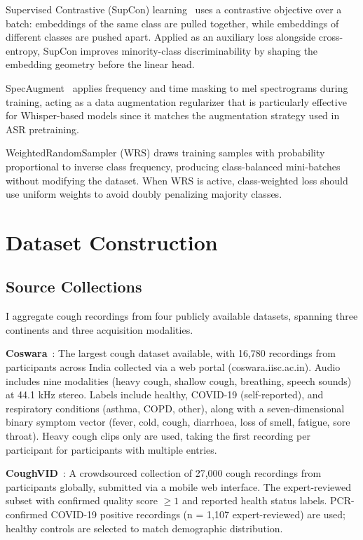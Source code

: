\documentclass[10pt,journal,compsoc]{IEEEtran}
\begin{document}
Supervised Contrastive (SupCon) learning~\cite{supcon} uses a contrastive
objective over a batch: embeddings of the same class are pulled together,
while embeddings of different classes are pushed apart. Applied as an
auxiliary loss alongside cross-entropy, SupCon improves minority-class
discriminability by shaping the embedding geometry before the linear head.

SpecAugment~\cite{specaugment} applies frequency and time masking to
mel spectrograms during training, acting as a data augmentation regularizer
that is particularly effective for Whisper-based models since it matches
the augmentation strategy used in ASR pretraining.

WeightedRandomSampler (WRS) draws training samples with probability
proportional to inverse class frequency, producing class-balanced mini-batches
without modifying the dataset. When WRS is active, class-weighted loss
should use uniform weights to avoid doubly penalizing majority classes.

\section{Dataset Construction}
\label{sec:dataset}

\subsection{Source Collections}

I aggregate cough recordings from four publicly available datasets,
spanning three continents and three acquisition modalities.

\textbf{Coswara}~\cite{coswara}: The largest cough dataset available,
with 16{,}780 recordings from participants across India collected via a
web portal (coswara.iisc.ac.in). Audio includes nine modalities (heavy
cough, shallow cough, breathing, speech sounds) at 44.1 kHz stereo.
Labels include healthy, COVID-19 (self-reported), and respiratory conditions
(asthma, COPD, other), along with a seven-dimensional binary symptom
vector (fever, cold, cough, diarrhoea, loss of smell, fatigue, sore throat).
Heavy cough clips only are used, taking the first recording per participant
for participants with multiple entries.

\textbf{CoughVID}~\cite{coughvid}: A crowdsourced collection of 27{,}000
cough recordings from participants globally, submitted via a mobile web
interface. The expert-reviewed subset with confirmed quality
score $\geq 1$ and reported health status labels.
PCR-confirmed COVID-19 positive recordings (n = 1{,}107 expert-reviewed)
are used; healthy controls are selected to match demographic distribution.
\end{document}
